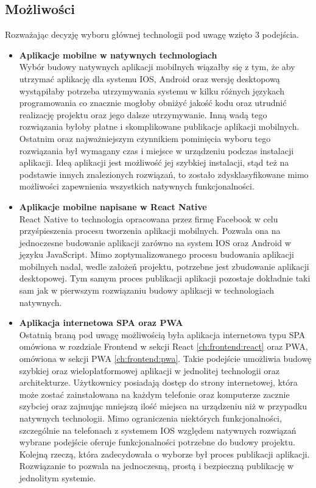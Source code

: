 \subsection{Możliwości}
Rozważając decyzję wyboru głównej technologii pod uwagę wzięto 3 podejścia.
\begin{itemize}
    \item \textbf {Aplikacje mobilne w natywnych technologiach} \\
        Wybór budowy natywnych aplikacji mobilnych wiązałby się z tym, że aby utrzymać aplikację dla systemu IOS, Android oraz wersję desktopową wystąpiłaby potrzeba utrzymywania systemu w kilku różnych językach programowania co znacznie mogłoby obniżyć jakość kodu oraz utrudnić realizację projektu oraz jego dalsze utrzymywanie. Inną wadą tego rozwiązania byłoby płatne i skomplikowane publikacje aplikacji mobilnych. Ostatnim oraz najważniejszym czynnikiem pominięcia wyboru tego rozwiązania był wymagany czas i miejsce w urządzeniu podczas instalacji aplikacji. Ideą aplikacji jest możliwość jej szybkiej instalacji, stąd też na podstawie innych znalezionych rozwiązań, to zostało zdysklasyfikowane mimo możliwości zapewnienia wszystkich natywnych funkcjonalności.

    \item \textbf {Aplikacje mobilne napisane w React Native} \\
        React Native to technologia opracowana przez firmę Facebook w celu przyśpieszenia procesu tworzenia aplikacji mobilnych. Pozwala ona na jednoczesne budowanie aplikacji zarówno na system IOS oraz Android w języku JavaScript. Mimo zoptymalizowanego procesu budowania aplikacji mobilnych nadal, wedle założeń projektu, potrzebne jest zbudowanie aplikacji desktopowej. Tym samym proces publikacji aplikacji pozostaje dokładnie taki sam jak w pierwszym rozwiązaniu budowy aplikacji w technologiach natywnych.

    \item \textbf {Aplikacja internetowa SPA oraz PWA} \\
        Ostatnią braną pod uwagę możliwością była aplikacja internetowa typu SPA omówiona w rozdziale Frontend w sekcji React \ref{ch:frontend:react} oraz PWA, omówiona w sekcji PWA \ref{ch:frontend:pwa}. Takie podejście umożliwia budowę szybkiej oraz wieloplatformowej aplikacji w jednolitej technologii oraz architekturze. Użytkownicy posiadają dostęp do strony internetowej, która może zostać zainstalowana na każdym telefonie oraz komputerze zacznie szybciej oraz zajmując mniejszą ilość miejsca na urządzeniu niż w przypadku natywnych technologii. Mimo ograniczenia niektórych funkcjonalności, szczególnie na telefonach z systemem IOS względem natywnych rozwiązań wybrane podejście oferuje funkcjonalności potrzebne do budowy projektu. Kolejną rzeczą, która zadecydowała o wyborze był proces publikacji aplikacji. Rozwiązanie to pozwala na jednoczesną, prostą i bezpieczną publikację w jednolitym systemie.
\end{itemize}

